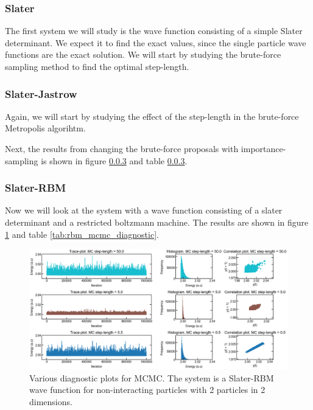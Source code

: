 \subsubsection{Slater}
The first system we will study is the wave function consisting of a simple Slater determinant. We expect it to find the exact values, since the single particle wave functions are the exact solution. We will start by studying the brute-force sampling method to find the optimal step-length. 

\subsubsection{Slater-Jastrow}
Again, we will start by studying the effect of the step-length in the brute-force Metropolis algorihtm. 

Next, the results from changing the brute-force proposals with importance-sampling is shown in figure \ref{} and table \ref{}. 

\subsubsection{Slater-RBM}
Now we will look at the system with a wave function consisting of a slater determinant and a restricted boltzmann machine. The results are shown in figure \ref{fig:rbm_mcmc_diagnostic} and table \ref{tab:rbm_mcmc_diagnostic}. 

\begin{figure}[h!]
    \centering
    \includegraphics[width=\textwidth]{test.png}
    \caption{Various diagnostic plots for MCMC. The system is a Slater-RBM wave function for non-interacting particles with 2 particles in 2 dimensions.}
    \label{fig:rbm_mcmc_diagnostic}
\end{figure}


